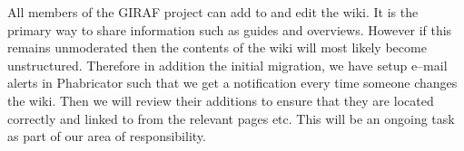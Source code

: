 All members of the GIRAF project can add to and edit the wiki.
It is the primary way to share information such as guides and overviews.
However if this remains unmoderated then the contents of the wiki will most likely become unstructured.
Therefore in addition the initial migration, we have setup e--mail alerts in Phabricator such that we get a notification every time someone changes the wiki.
Then we will review their additions to ensure that they are located correctly and linked to from the relevant pages etc.
This will be an ongoing task as part of our area of responsibility.
